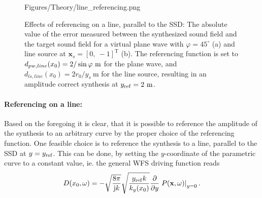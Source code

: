 \begin{figure}
	\centering
	\begin{overpic}[width = 1\columnwidth ]{Figures/Theory/line_referencing.png}
	\scriptsize
	\end{overpic}
\caption{Effects of referencing on a line, parallel to the SSD: The absolute value of the error measured between the synthesized sound field and the target sound field for a virtual plane wave with $\varphi = 45^{\circ}$ (a) and line source at $\mathbf{x}_s = [0,\ -1]^{\mathrm{T}}$ (b). The referencing function is set to $d_{pw,line}(x_0) = 2 / \sin\varphi ~\mathrm{m}$ for the plane wave, and $d_{ls,line}(x_0) = 2 r_0/y_s ~\mathrm{m}$ for the line source, resulting in an amplitude correct synthesis at $y_{\mathrm{ref}} = 2~\mathrm{m}$.}
	\label{Fig:Theory:line_referencing}
\end{figure}

\paragraph{Referencing on a line:\\}
Based on the foregoing it is clear, that it is possible to reference the amplitude of the synthesis to an arbitrary curve by the proper choice of the referencing function. 
One feasible choice is to reference the synthesis to a line, parallel to the SSD at $y=y_{\mathrm{ref}}$. This can be done, by setting the $y$-coordinate of the parametric curve to a constant value, ie. the general WFS driving function reads
\begin{equation}
D(x_0,\omega) = 
- \sqrt{\frac{8\pi}{\mathrm{j} k}} \sqrt{\frac{ y_{\mathrm{ref}} k}{k_y(x_0)}} \frac{\partial}{\partial y} \left. P(\mathbf{x},\omega) \right|_{y = 0}.
\label{Eq:Gen_rayleigh_dx0}
\end{equation}


